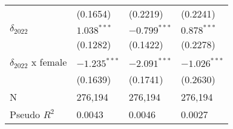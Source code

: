 \begin{tabular}{llll}
                           &           (0.1654) &           (0.2219) &           (0.2241) \\
$\delta_{2022}$            &      $1.038^{***}$ &     $-0.799^{***}$ &      $0.878^{***}$ \\
                           &           (0.1282) &           (0.1422) &           (0.2278) \\
$\delta_{2022}$ x female   &     $-1.235^{***}$ &     $-2.091^{***}$ &     $-1.026^{***}$ \\
                           &           (0.1639) &           (0.1741) &           (0.2630) \\
N                          &            276,194 &            276,194 &            276,194 \\
Pseudo $R^2$               &             0.0043 &             0.0046 &             0.0027 \\
\bottomrule
\end{tabular}
